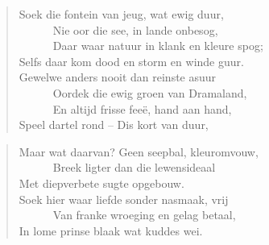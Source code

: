 \begin{verse}
Soek die fontein van jeug, wat ewig duur, \\ 
\ \ \ \ \ \ Nie oor die see, in lande onbesog, \\ 
\ \ \ \ \ \ Daar waar natuur in klank en kleure spog; \\ 
Selfs daar kom dood en storm en winde guur. \\ 
Gewelwe anders nooit dan reinste asuur \\ 
\ \ \ \ \ \ Oordek die ewig groen van Dramaland, \\ 
\ \ \ \ \ \ En altijd frisse fee\"e, hand aan hand, \\ 
Speel dartel rond -- Dis kort van duur, \\ 
\end{verse}

\begin{verse}
Maar wat daarvan? Geen seepbal, kleuromvouw, \\ 
\ \ \ \ \ \ Breek ligter dan die lewensideaal \\ 
Met diepverbete sugte opgebouw. \\ 
Soek hier waar liefde sonder nasmaak, vrij \\ 
\ \ \ \ \ \ Van franke wroeging en gelag betaal, \\ 
In lome prinse blaak wat kuddes wei. \\ 
\end{verse}